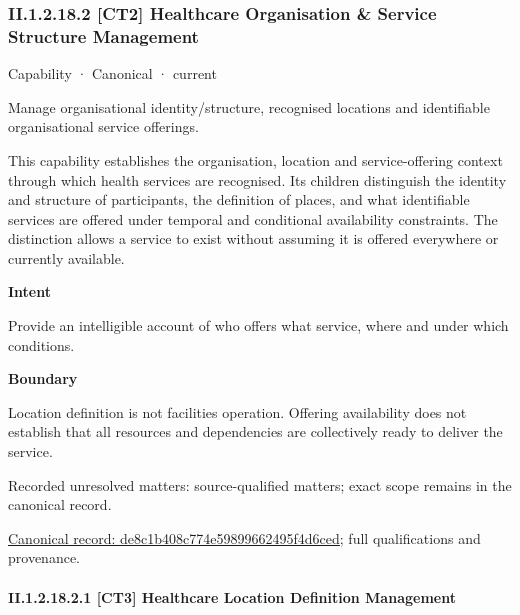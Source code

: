 \subsubsection*{II.1.2.18.2 [CT2] Healthcare Organisation \& Service Structure Management}
\label{navigation:II.1.2.18.2}

\label{element:de8c1b408c774e59899662495f4d6ced}
{\small Capability · Canonical · current}\par

Manage organisational identity/structure, recognised locations and identifiable organisational service offerings.



This capability establishes the organisation, location and service-offering context through which health services are recognised. Its children distinguish the identity and structure of participants, the definition of places, and what identifiable services are offered under temporal and conditional availability constraints. The distinction allows a service to exist without assuming it is offered everywhere or currently available.



\textbf{Intent}



Provide an intelligible account of who offers what service, where and under which conditions.



\textbf{Boundary}



Location definition is not facilities operation. Offering availability does not establish that all resources and dependencies are collectively ready to deliver the service.


{\small Recorded unresolved matters: source-qualified matters; exact scope remains in the canonical record.}\par
{\footnotesize \href{../../../../continuum/strategy/capability/de8c1b408c774e59899662495f4d6ced.md}{Canonical record: de8c1b408c774e59899662495f4d6ced}; full qualifications and provenance.}\par
\paragraph*{II.1.2.18.2.1 [CT3] Healthcare Location Definition Management}
\label{navigation:II.1.2.18.2.1}

